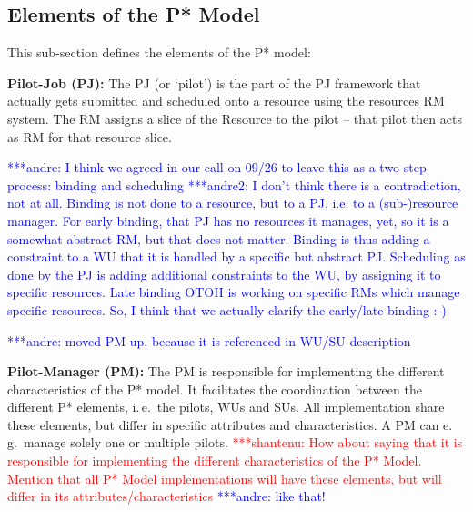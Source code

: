 \documentclass[conference,final]{IEEEtran}
\newcommand{\jhanote}[1]{ {\textcolor{red} { ***shantenu: #1 }}}
\newcommand{\alnote}[1]{ {\textcolor{blue} { ***andre: #1 }}}
\newcommand{\amnote}[1]{ {\textcolor{blue} { ***andre2: #1 }}}
\newcommand{\alnote}[1]{}
\newcommand{\amnote}[1]{}
\newcommand{\jhanote}[1]{}
\newcommand{\upp}{\vspace*{-0.5em}}
\begin{document}
\subsection{Elements of the P* Model \upp\upp}
\noindent This sub-section defines the elements of the P* model:

\begin{compactitem}

\item \textbf{Pilot-Job (PJ):} The PJ (or `pilot') is
  the part of the PJ framework that actually gets submitted and 
  scheduled onto a resource using the resources RM system.  The 
  RM assigns a slice of the Resource to the pilot -- that pilot 
  then acts as RM for that resource slice.  

\alnote{I think we agreed in our call on 09/26 to leave this as a two step
process: binding and scheduling}
\amnote{I don't think there is a contradiction, not at all.  Binding
is not done to a resource, but to a PJ, i.e. to a (sub-)resource manager.  
For early binding, that PJ has no resources it manages, yet, so it is
a somewhat abstract RM, but that does not matter. Binding is thus
adding a constraint to a WU that it is handled by a specific but
abstract PJ.  Scheduling as done by the PJ is adding additional
constraints to the WU, by assigning it to specific resources.  Late
binding OTOH is working on specific RMs which manage specific
resources.  So, I think that we actually clarify the early/late
binding :-)}

\alnote{moved PM up, because it is referenced in WU/SU description}
\item \textbf{Pilot-Manager (PM):} The PM is responsible for implementing 
  the different characteristics of the P* model. It facilitates the 
  coordination between the different P* elements, i.\,e.\ the
  pilots, WUs and SUs. All implementation share these elements, but differ in 
  specific attributes and characteristics. A PM can e.\,g.\ manage solely one 
  or multiple pilots. 
 \jhanote{How about saying that it is responsible for
    implementing the different characteristics of the P*
    Model. Mention that all P* Model implementations will have these
    elements, but will differ in its attributes/characteristics} \alnote{like 
	that!}


\end{compactitem}
\end{document}
